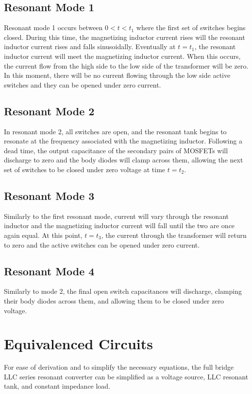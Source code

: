 \documentclass[conference]{IEEEtran}
\begin{document}
\subsection{Resonant Mode 1}
Resonant mode 1 occurs between $0<t<t_1$ where the first set of switches begins closed.
During this time, the magnetizing inductor current rises will the resonant inductor current rises and falls sinusoidally.
Eventually at $t=t_1$, the resonant inductor current will meet the magnetizing inductor current.
When this occurs, the current flow from the high side to the low side of the transformer will be zero.
In this moment, there will be no current flowing through the low side active switches and they can be opened under zero current.

\subsection{Resonant Mode 2}

In resonant mode 2, all switches are open, and the resonant tank begins to resonate at the frequency associated with the magnetizing inductor.
Following a dead time, the output capacitance of the secondary pairs of MOSFETs will discharge to zero and the body diodes will clamp across them, allowing the next set of switches to be closed under zero voltage at time $t=t_2$.
\subsection{Resonant Mode 3}

Similarly to the first resonant mode, current will vary through the resonant inductor and the magnetizing inductor current will fall until the two are once again equal.
At this point, $t=t_3$, the current through the transformer will return to zero and the active switches can be opened under zero current.
\subsection{Resonant Mode 4}

Similarly to mode 2, the final open switch capacitances will discharge, clamping their body diodes across them, and allowing them to be closed under zero voltage.
\section{Equivalenced Circuits}

For ease of derivation and to simplify the necessary equations, the full bridge LLC series resonant converter can be simplified as a voltage source, LLC resonant tank, and constant impedance load.
\end{document}
